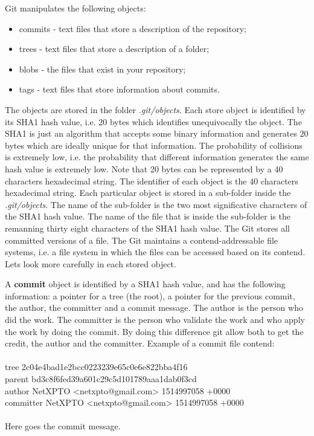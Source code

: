 \begin{refsection}
Git manipulates the following objects:

\begin{itemize}
    \item[\textbullet] {commits - text files that store a description of the repository;}
    \item[\textbullet] {trees - text files that store a description of a folder;}
    \item[\textbullet] {blobs - the files that exist in your repository;}
    \item[\textbullet] {tags - text files that store information about commits.}
\end{itemize}
%
\noindent The objects are stored in the folder \emph{.git/objects}.
Each store object is identified by its SHA1 hash value, i.e. 20 bytes which identifies unequivocally the object.
The SHA1 is just an algorithm that accepts some binary information and generates 20 bytes which are ideally unique for that information. The probability of collisions is extremely low, i.e. the probability that different information generates the same hash value is extremely low.
Note that 20 bytes can be represented by a 40 characters hexadecimal string.
The identifier of each object is the 40 characters hexadecimal string.
Each particular object is stored in a sub-folder inside the \emph{.git/objects}.
The name of the sub-folder is the two most significative characters of the SHA1 hash value.
The name of the file that is inside the sub-folder is the remanning thirty eight characters of the SHA1 hash value.
The Git stores all committed versions of a file.
The Git maintains a contend-addressable file systems, i.e. a file system in which the files can be accessed based on its contend. Lets look more carefully in each stored object.

A \textbf{commit} object is identified by a SHA1 hash value, and has the following information: a pointer for a tree (the root), a pointer for the previous commit, the author, the committer and a commit message.
The author is the person who did the work. The committer is the person who validate the work and who apply the work by doing the commit. By doing this difference git allow both to get the credit, the author and the committer. Example of a commit file contend:\\
\\
tree 2c04e4bad1e2bcc0223239e65c0e6e822bba4f16\\
parent bd3c8f6fed39a601c29c5d101789aaa1dab0f3cd\\
author NetXPTO <netxpto@gmail.com> 1514997058 +0000\\
committer NetXPTO <netxpto@gmail.com> 1514997058 +0000\\
\\
Here goes the commit message.\\


\end{refsection}
